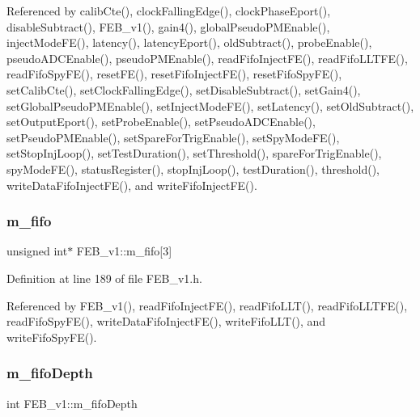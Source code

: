 Referenced by calib\+Cte(), clock\+Falling\+Edge(), clock\+Phase\+Eport(), disable\+Subtract(), F\+E\+B\+\_\+v1(), gain4(), global\+Pseudo\+P\+M\+Enable(), inject\+Mode\+F\+E(), latency(), latency\+Eport(), old\+Subtract(), probe\+Enable(), pseudo\+A\+D\+C\+Enable(), pseudo\+P\+M\+Enable(), read\+Fifo\+Inject\+F\+E(), read\+Fifo\+L\+L\+T\+F\+E(), read\+Fifo\+Spy\+F\+E(), reset\+F\+E(), reset\+Fifo\+Inject\+F\+E(), reset\+Fifo\+Spy\+F\+E(), set\+Calib\+Cte(), set\+Clock\+Falling\+Edge(), set\+Disable\+Subtract(), set\+Gain4(), set\+Global\+Pseudo\+P\+M\+Enable(), set\+Inject\+Mode\+F\+E(), set\+Latency(), set\+Old\+Subtract(), set\+Output\+Eport(), set\+Probe\+Enable(), set\+Pseudo\+A\+D\+C\+Enable(), set\+Pseudo\+P\+M\+Enable(), set\+Spare\+For\+Trig\+Enable(), set\+Spy\+Mode\+F\+E(), set\+Stop\+Inj\+Loop(), set\+Test\+Duration(), set\+Threshold(), spare\+For\+Trig\+Enable(), spy\+Mode\+F\+E(), status\+Register(), stop\+Inj\+Loop(), test\+Duration(), threshold(), write\+Data\+Fifo\+Inject\+F\+E(), and write\+Fifo\+Inject\+F\+E().

\mbox{\label{classFEB__v1_ae5b770f2f5ffb97324862c93e3153985}} 
\subsubsection{\texorpdfstring{m\+\_\+fifo}{m\_fifo}}
{\footnotesize\ttfamily unsigned int$\ast$ F\+E\+B\+\_\+v1\+::m\+\_\+fifo\mbox{[}3\mbox{]}\hspace{0.3cm}{\ttfamily [private]}}



Definition at line 189 of file F\+E\+B\+\_\+v1.\+h.



Referenced by F\+E\+B\+\_\+v1(), read\+Fifo\+Inject\+F\+E(), read\+Fifo\+L\+L\+T(), read\+Fifo\+L\+L\+T\+F\+E(), read\+Fifo\+Spy\+F\+E(), write\+Data\+Fifo\+Inject\+F\+E(), write\+Fifo\+L\+L\+T(), and write\+Fifo\+Spy\+F\+E().

\mbox{\label{classFEB__v1_a30473bcdd8f018ad5dac728f6779df9c}} 
\subsubsection{\texorpdfstring{m\+\_\+fifo\+Depth}{m\_fifoDepth}}
{\footnotesize\ttfamily int F\+E\+B\+\_\+v1\+::m\+\_\+fifo\+Depth\hspace{0.3cm}{\ttfamily [private]}}



